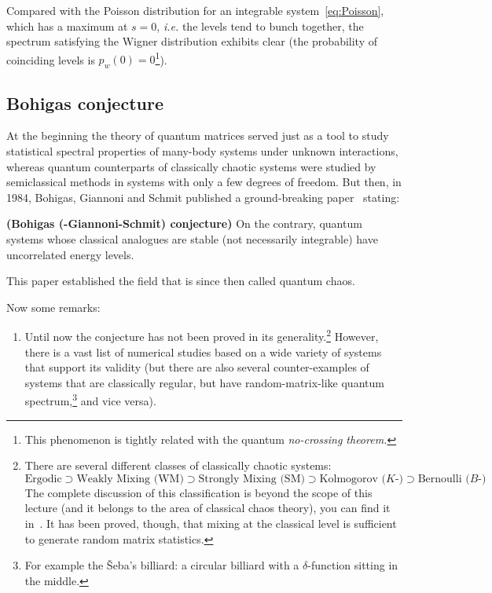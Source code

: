 \documentclass[a4paper,11pt,twoside]{article}
\begin{document}
        Compared with the Poisson distribution for an integrable system~\eqref{eq:Poisson}, which has a maximum at $s=0$, \emph{i.e.} the levels tend to bunch together, the spectrum satisfying the Wigner distribution exhibits clear  (the probability of coinciding levels is $p_{w}(0)=0$\footnote{This phenomenon is tightly related with the quantum \emph{no-crossing theorem.}}). 

        \subsection{Bohigas conjecture}
        At the beginning the theory of quantum matrices served just as a tool to study statistical spectral properties of many-body systems under unknown interactions, whereas quantum counterparts of classically chaotic systems were studied by semiclassical methods in systems with only a few degrees of freedom.
        But then, in 1984, Bohigas, Giannoni and Schmit published a ground-breaking paper~\cite{Boh84} stating:
        \begin{theorem}
            {\bf (Bohigas (-Giannoni-Schmit) conjecture)}
            On the contrary, quantum systems whose classical analogues are stable (not necessarily integrable) have uncorrelated energy levels.
        \end{theorem}
        This paper established the field that is since then called quantum chaos.

        Now some remarks: 
        \begin{enumerate}
            \item Until now the conjecture has not been proved in its generality.\footnote{
                    There are several different classes of classically chaotic systems:
                    \begin{equation*}
                        \boxed{\text{Ergodic}}
                            \supset\boxed{\text{Weakly Mixing (WM)}}
                            \supset\boxed{\text{Strongly Mixing (SM)}}
                            \supset\boxed{\text{Kolmogorov ($K$-)}}
                            \supset\boxed{\text{Bernoulli ($B$-)}}
                    \end{equation*}
                    The complete discussion of this classification is beyond the scope of this lecture (and it belongs to the area of classical chaos theory), you can find it in~\cite{Sin77}.
                    It has been proved, though, that mixing at the classical level is sufficient to generate random matrix statistics.
                } 
                However, there is a vast list of numerical studies based on a wide variety of systems that support its validity (but there are also several counter-examples of systems that are classically regular, but have random-matrix-like quantum spectrum,\footnote{For example the Šeba's billiard: a circular billiard with a $\delta$-function sitting in the middle.} and vice versa).
        \end{enumerate}
\end{document}
